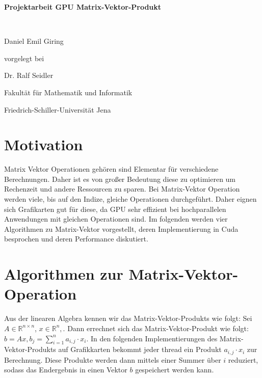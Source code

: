 \documentclass[10pt,a4paper]{article}
\begin{document}
	\begin{center}
		\begin{LARGE}
			\vspace*{1.5cm}
			\textbf{
				Projektarbeit GPU Matrix-Vektor-Produkt
			}
		\end{LARGE}
		\\ \vspace{1.5cm}
		\begin{large}
			Daniel Emil Giring
			\vfill
		\end{large}
		\begin{normalsize}
			vorgelegt bei\\ \vspace{1.5cm}
		\end{normalsize}
		\begin{normalsize}
			Dr. Ralf Seidler
			\\ \vspace{1.5cm}
			
			Fakultät für Mathematik und Informatik\\
		\end{normalsize}
		\vfill%
		\begin{figure}[h]
			\centering
			\centering
		\end{figure}
		\vfill%
		Friedrich-Schiller-Universität Jena
		\\ \vfill%
	\end{center}
	
	\newpage
	\tableofcontents
	\newpage
	\section{Motivation}
	Matrix Vektor Operationen gehören sind Elementar für verschiedene Berechnungen. Daher ist es von großer Bedeutung diese zu optimieren um Rechenzeit und andere Ressourcen zu sparen. Bei Matrix-Vektor Operation werden viele, bis auf den Indize, gleiche Operationen durchgeführt. Daher eignen sich Grafikarten gut für diese, da GPU sehr effizient bei hochparallelen Anwendungen mit gleichen Operationen sind. Im folgenden werden vier Algorithmen zu Matrix-Vektor vorgestellt, deren Implementierung in Cuda besprochen und deren Performance diskutiert.
	\section{Algorithmen zur Matrix-Vektor-Operation}
	Aus der linearen Algebra kennen wir das Matrix-Vektor-Produkts wie folgt: Sei $A \in \mathbb{R}^{n\times n}$, $x\in \mathbb{R}^n,$. Dann errechnet sich das Matrix-Vektor-Produkt wie folgt: $ b=Ax, b_j=\sum_{i=1}^n a_{i,j} \cdot x_i$. In den folgenden Implementierungen des Matrix-Vektor-Produkts auf Grafikkarten bekommt jeder thread ein Produkt $a_{i,j}\cdot x_i$ zur Berechnung. Diese Produkte werden dann mittels einer Summer über $i$ reduziert, sodass das Endergebnis in einen Vektor $b$ gespeichert werden kann.
\end{document}
